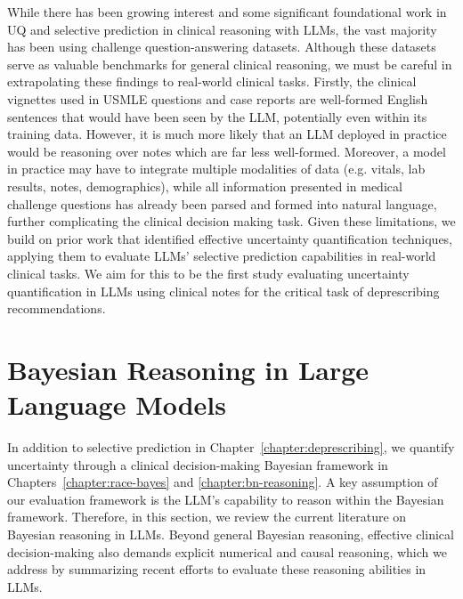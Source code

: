 While there has been growing interest and some significant foundational work in UQ and selective prediction in clinical reasoning with LLMs, the vast majority has been using challenge question-answering datasets. Although these datasets serve as valuable benchmarks for general clinical reasoning, we must be careful in extrapolating these findings to real-world clinical tasks. Firstly, the clinical vignettes used in USMLE questions and case reports are well-formed English sentences that would have been seen by the LLM, potentially even within its training data. However, it is much more likely that an LLM deployed in practice would be reasoning over notes which are far less well-formed. Moreover, a model in practice may have to integrate multiple modalities of data (e.g. vitals, lab results, notes, demographics), while all information presented in medical challenge questions has already been parsed and formed into natural language, further complicating the clinical decision making task. Given these limitations, we build on prior work that identified effective uncertainty quantification techniques, applying them to evaluate LLMs' selective prediction capabilities in real-world clinical tasks. We aim for this to be the first study evaluating uncertainty quantification in LLMs using clinical notes for the critical task of deprescribing recommendations.

\section{Bayesian Reasoning in Large Language Models}
In addition to selective prediction in Chapter~\ref{chapter:deprescribing}, we quantify uncertainty through a clinical decision-making Bayesian framework in Chapters~\ref{chapter:race-bayes} and \ref{chapter:bn-reasoning}. A key assumption of our evaluation framework is the LLM's capability to reason within the Bayesian framework. Therefore, in this section, we review the current literature on Bayesian reasoning in LLMs. Beyond general Bayesian reasoning, effective clinical decision-making also demands explicit numerical and causal reasoning, which we address by summarizing recent efforts to evaluate these reasoning abilities in LLMs.


